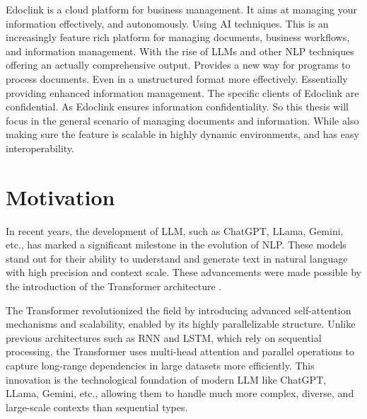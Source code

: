 \cleardoublepage
\label{chap:intro}
Edoclink is a cloud platform for business management. It aims at managing your information effectively, and autonomously. Using AI techniques. This is an increasingly feature rich platform for managing documents, business workflows, and information management.
With the rise of \acp{LLM} and other \ac{NLP} techniques offering an actually comprehensive output. Provides a new way for programs to process documents. Even in a unstructured format more effectively. Essentially providing enhanced information management.
The specific clients of Edoclink are confidential. As Edoclink ensures information confidentiality. So this thesis will focus in the general scenario of managing documents and information. While also making sure the feature is scalable in highly dynamic environments, and has easy interoperability.

\section{Motivation}

In recent years, the development of \ac{LLM}, such as ChatGPT, LLama, Gemini, etc., has marked a significant milestone in the evolution of \ac{NLP}. These models stand out for their ability to understand and generate text in natural language with high precision and context scale. These advancements were made possible by the introduction of the Transformer architecture \cite{vaswani2017attention}.

The Transformer revolutionized the field by introducing advanced self-attention mechanisms and scalability, enabled by its highly parallelizable structure. Unlike previous architectures such as \ac{RNN} and \ac{LSTM}, which rely on sequential processing, the Transformer uses multi-head attention and parallel operations to capture long-range dependencies in large datasets more efficiently. This innovation is the technological foundation of modern \ac{LLM} like ChatGPT, LLama, Gemini, etc., allowing them to handle much more complex, diverse, and large-scale contexts than sequential types.

